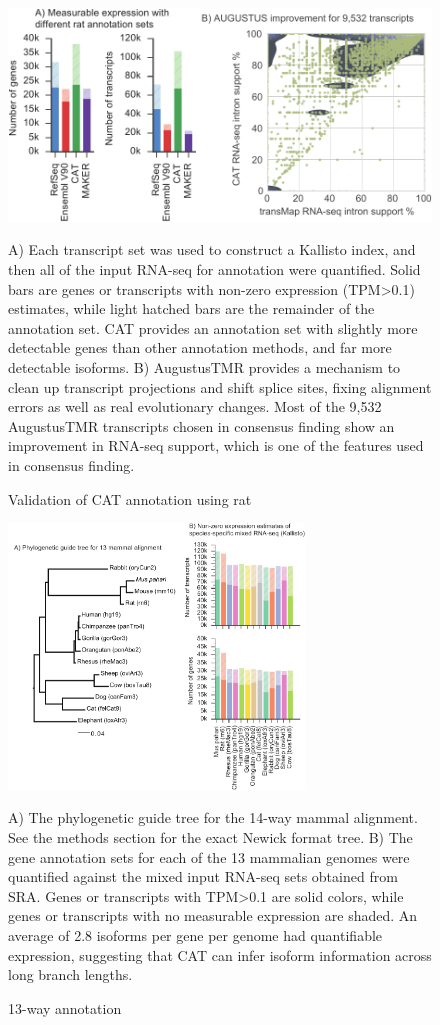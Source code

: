 \begin{figure}
\centering
\includegraphics[width=\textwidth,height=\textheight,keepaspectratio]{Figure_5.pdf}
\caption{Validation of CAT annotation using rat}
A) Each transcript set was used to construct a Kallisto  \citep{bray2015near} index, and then all of the input RNA-seq for annotation were quantified. Solid bars are genes or transcripts with non-zero expression (TPM\textgreater 0.1) estimates, while light hatched bars are the remainder of the annotation set. CAT provides an annotation set with slightly more detectable genes than other annotation methods, and far more detectable isoforms. B) AugustusTMR provides a mechanism to clean up transcript projections and shift splice sites, fixing alignment errors as well as real evolutionary changes. Most of the 9,532 AugustusTMR transcripts chosen in consensus finding show an improvement in RNA-seq support, which is one of the features used in consensus finding.
\label{fig:rat_validation}
\end{figure}

\begin{figure}
\centering
\includegraphics[width=0.7\textwidth,height=0.7\textheight,keepaspectratio]{Figure_6.pdf}
\caption{13-way annotation}
A) The phylogenetic guide tree for the 14-way mammal alignment. See the methods section for the exact Newick format tree. B) The gene annotation sets for each of the 13 mammalian genomes were quantified against the mixed input RNA-seq sets obtained from SRA. Genes or transcripts with TPM\textgreater 0.1 are solid colors, while genes or transcripts with no measurable expression are shaded. An average of 2.8 isoforms per gene per genome had quantifiable expression, suggesting that CAT can infer isoform information across long branch lengths.
\label{fig:13way}
\end{figure}

